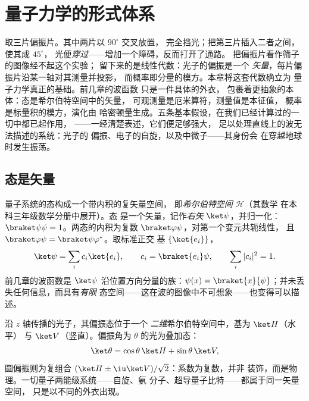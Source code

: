 \chapter{量子力学的形式体系}\label{ch:b3:quantum-formalism}

取三片偏振片。其中两片以 $90^\circ$ 交叉放置，
完全挡光；把第三片插入二者之间，使其成 $45^\circ$，
光便\emph{穿过}——增加一个障碍，反而打开了通路。
把偏振片看作筛子的图像经不起这个实验；
留下来的是线性代数：光子的偏振是一个
\emph{矢量}，每片偏振片沿某一轴对其测量并投影，
而概率即分量的模方。本章将这套代数确立为
量子力学真正的基础。前几章的波函数
只是一件具体的外衣，
包裹着更抽象的本体：态是希尔伯特空间中的矢量，
可观测量是厄米算符，测量值是本征值，
概率是标量积的模方，演化由
哈密顿量生成。五条基本假设，在我们已经计算过的一切中都已起作用，
——一经清楚表述，它们便足够强大，
足以处理直线上的波无法描述的系统：光子的
偏振、电子的自旋，以及中微子——其身份会
在穿越地球时发生振荡。

\section{态是矢量}

\begin{definition}\label{def:b3:quantum-formalism:state}
量子系统的态构成一个带内积的复矢量空间，
即\emph{希尔伯特空间} $\mathcal H$（其数学
在本科三年级数学分册中展开）。态
是一个矢量，记作\emph{右矢} $\ket\psi$，并归一化：
$\braket\psi\psi = 1$。两态的内积为复数
$\braket\varphi\psi$，对第一个变元共轭线性，
且 $\braket\varphi\psi = \braket\psi\varphi^*$。取标准正交
基 $\{\ket{e_i}\}$，
\[
\ket\psi = \sum_i c_i\ket{e_i} , \qquad
c_i = \braket{e_i}\psi , \qquad
\sum_i|c_i|^2 = 1 .
\]
前几章的波函数是
$\ket\psi$ 沿位置方向分量的族：$\psi(x) =
\braket{x}{\psi}$；并未丢失任何信息，而具有\emph{有限}
态空间——这在波的图像中不可想象——也变得可以描述。
\end{definition}

\begin{example}\label{ex:b3:quantum-formalism:polarization}
沿 $z$ 轴传播的光子，其偏振态位于一个
\emph{二维}希尔伯特空间中，基为 $\ket H$（水平）
与 $\ket V$（竖直）。偏振角为
$\theta$ 的光为叠加态：
\[
\ket\theta = \cos\theta\,\ket H + \sin\theta\,\ket V ,
\]
圆偏振则为复组合 $(\ket H \pm
\iu\ket V)/\sqrt2$：系数为复数，并非
装饰，而是物理。一切量子两能级系统——自旋、氨
分子、超导量子比特——都属于同一矢量空间，
只是以不同的外衣出现。
\end{example}

